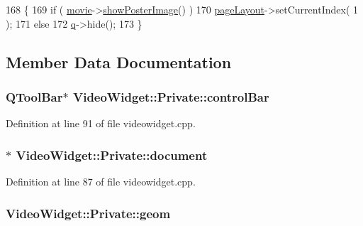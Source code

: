 \begin{DoxyCode}
168 \{
169     \textcolor{keywordflow}{if} ( \hyperlink{classVideoWidget_1_1Private_a500f2a0b237f083a573b689a1bb0a90a}{movie}->\hyperlink{classOkular_1_1Movie_abbd73c60d6503641c04c945ba00cc809}{showPosterImage}() )
170         \hyperlink{classVideoWidget_1_1Private_afcb2f757498947705dafb8305e0fb0bc}{pageLayout}->setCurrentIndex( 1 );
171     \textcolor{keywordflow}{else}
172         \hyperlink{classVideoWidget_1_1Private_ac4360af14b1cdb4912d507cbb3a941a8}{q}->hide();
173 \}
\end{DoxyCode}


\subsection{Member Data Documentation}
\hypertarget{classVideoWidget_1_1Private_a1b6973ec2db407feeaaa362f436440f5}{
\subsubsection[{control\+Bar}]{\setlength{\rightskip}{0pt plus 5cm}Q\+Tool\+Bar$\ast$ Video\+Widget\+::\+Private\+::control\+Bar}}\label{classVideoWidget_1_1Private_a1b6973ec2db407feeaaa362f436440f5}


Definition at line 91 of file videowidget.\+cpp.

\hypertarget{classVideoWidget_1_1Private_a895eab69b0a523e279dafe00bb9f208c}{
\subsubsection[{document}]{$\ast$ Video\+Widget\+::\+Private\+::document}}\label{classVideoWidget_1_1Private_a895eab69b0a523e279dafe00bb9f208c}


Definition at line 87 of file videowidget.\+cpp.

\hypertarget{classVideoWidget_1_1Private_a11423c5cfafc4c6a7b573b9c4e010a4b}{
\subsubsection[{geom}]{ Video\+Widget\+::\+Private\+::geom}}\label{classVideoWidget_1_1Private_a11423c5cfafc4c6a7b573b9c4e010a4b}


